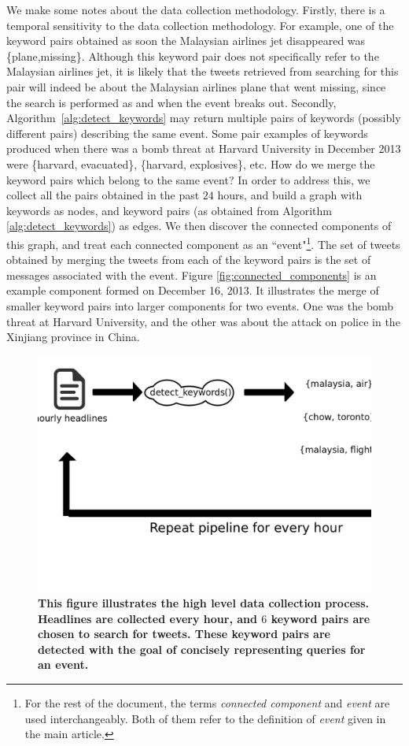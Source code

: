 We make some notes about the data collection methodology. Firstly,
there is a temporal sensitivity to the data collection methodology.
For example, one of the keyword pairs obtained as soon the Malaysian
airlines jet disappeared was \{plane,missing\}. Although this keyword
pair does not specifically refer to the Malaysian airlines jet, it is
likely that the tweets retrieved from searching for this pair will
indeed be about the Malaysian airlines plane that went missing, since
the search is performed as and when the event breaks out. Secondly,
Algorithm~\ref{alg:detect_keywords} may return multiple pairs of
keywords (possibly different pairs) describing the same event. Some
pair examples of keywords produced when there was a bomb threat at
Harvard University in December 2013 were \{harvard, evacuated\},
\{harvard, explosives\}, etc. How do we merge the keyword pairs which
belong to the same event? In order to address this, we collect all the
pairs obtained in the past $24$ hours, and build a graph with keywords
as nodes, and keyword pairs (as obtained from Algorithm
{\ref{alg:detect_keywords}}) as edges. We then discover the connected
components of this graph, and treat each connected component as an
``event"\footnote{For the rest of the document, the terms
  \emph{connected component} and \emph{event} are used
  interchangeably. Both of them refer to the definition of
  \emph{event} given in the main article.}. The set of tweets obtained
by merging the tweets from each of the keyword pairs is the set of
messages associated with the event. Figure
\ref{fig:connected_components} is an example component formed on
December 16, 2013. It illustrates the merge of smaller keyword pairs
into larger components for two events. One was the bomb threat at
Harvard University, and the other was about the attack on police in
the Xinjiang province in China.

\begin{figure}
  \includegraphics[width=\textwidth]{figures_supp/Pictures_and_Drawings/data_collection_1}
  \caption{\textbf{This figure illustrates the high level data
      collection process. Headlines are collected every hour, and $6$
      keyword pairs are chosen to search for tweets. These keyword
      pairs are detected with the goal of concisely representing
      queries for an event.}}
  \label{fig:data_collection_1}
\end{figure}


